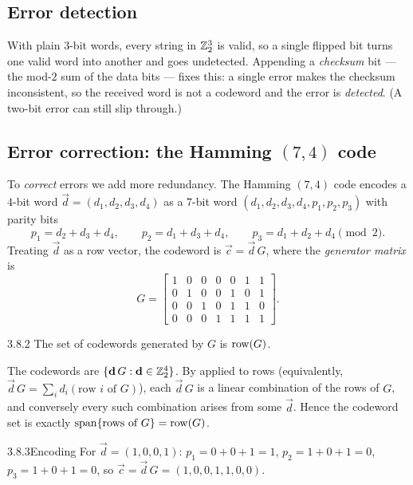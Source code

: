 \subsection{Error detection}

With plain $3$-bit words, every string in $\mathbb{Z}_2^3$ is valid, so a single flipped bit turns one valid word into another and goes undetected. Appending a \emph{checksum} bit --- the mod-$2$ sum of the data bits --- fixes this: a single error makes the checksum inconsistent, so the received word is not a codeword and the error is \emph{detected}. (A two-bit error can still slip through.)

\subsection{Error correction: the Hamming $(7,4)$ code}

To \emph{correct} errors we add more redundancy. The Hamming $(7,4)$ code encodes a $4$-bit word $\vec{d}=(d_1,d_2,d_3,d_4)$ as a $7$-bit word $(d_1,d_2,d_3,d_4,p_1,p_2,p_3)$ with parity bits
\[
p_1=d_2+d_3+d_4,\qquad p_2=d_1+d_3+d_4,\qquad p_3=d_1+d_2+d_4\pmod 2.
\]
Treating $\vec{d}$ as a row vector, the codeword is $\vec{c}=\vec{d}\,G$, where the \emph{generator matrix} is
\[
G=\begin{bmatrix}1&0&0&0&0&1&1\\0&1&0&0&1&0&1\\0&0&1&0&1&1&0\\0&0&0&1&1&1&1\end{bmatrix}.
\]

\begin{lems}{3.8.2}{}
The set of codewords generated by $G$ is $\operatorname{row}(G)$.
\end{lems}

\begin{prf}
The codewords are $\{\mathbf{d}\,G:\mathbf{d}\in\mathbb{Z}_2^4\}$. By  applied to rows (equivalently, $\vec{d}\,G=\sum_i d_i(\text{row }i\text{ of }G)$), each $\vec{d}\,G$ is a linear combination of the rows of $G$, and conversely every such combination arises from some $\vec{d}$. Hence the codeword set is exactly $\operatorname{span}\{\text{rows of }G\}=\operatorname{row}(G)$.
\end{prf}

\begin{exmp}{3.8.3}{Encoding}
For $\vec{d}=(1,0,0,1)$: $p_1=0{+}0{+}1=1$, $p_2=1{+}0{+}1=0$, $p_3=1{+}0{+}1=0$, so $\vec{c}=\vec{d}\,G=(1,0,0,1,1,0,0)$.
\end{exmp}

